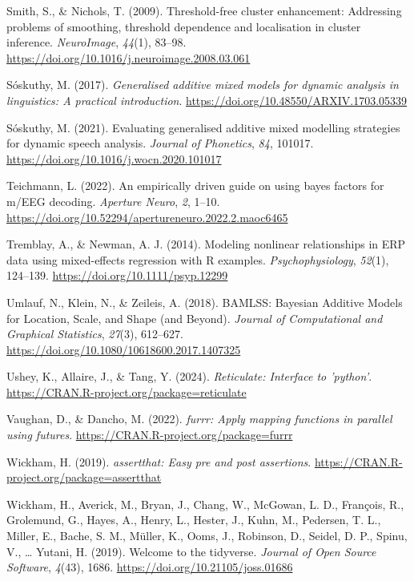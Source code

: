 \documentclass[
  doc,
  floatsintext,
  longtable,
  a4paper,
  nolmodern,
  notxfonts,
  notimes,
  donotrepeattitle,
  colorlinks=true,linkcolor=blue,citecolor=blue,urlcolor=blue]{apa7}
\newlength{\cslhangindent}
\newenvironment{CSLReferences}[2] %
 {\begin{list}{}{%
  \setlength{\itemindent}{0pt}
  \setlength{\leftmargin}{0pt}
  \setlength{\parsep}{0pt}
  \ifodd #1
   \setlength{\leftmargin}{\cslhangindent}
   \setlength{\itemindent}{-1\cslhangindent}
  \fi
  \setlength{\itemsep}{#2\baselineskip}}}
 {\end{list}}
\begin{document}
\begin{CSLReferences}{1}{0}
Smith, S., \& Nichols, T. (2009). Threshold-free cluster enhancement:
Addressing problems of smoothing, threshold dependence and localisation
in cluster inference. \emph{NeuroImage}, \emph{44}(1), 83--98.
\url{https://doi.org/10.1016/j.neuroimage.2008.03.061}

Sóskuthy, M. (2017). \emph{Generalised additive mixed models for dynamic
analysis in linguistics: A practical introduction}.
\url{https://doi.org/10.48550/ARXIV.1703.05339}

Sóskuthy, M. (2021). Evaluating generalised additive mixed modelling
strategies for dynamic speech analysis. \emph{Journal of Phonetics},
\emph{84}, 101017. \url{https://doi.org/10.1016/j.wocn.2020.101017}

Teichmann, L. (2022). An empirically driven guide on using bayes factors
for m/EEG decoding. \emph{Aperture Neuro}, \emph{2}, 1--10.
\url{https://doi.org/10.52294/apertureneuro.2022.2.maoc6465}

Tremblay, A., \& Newman, A. J. (2014). Modeling nonlinear relationships
in ERP data using mixed{-}effects regression with R examples.
\emph{Psychophysiology}, \emph{52}(1), 124--139.
\url{https://doi.org/10.1111/psyp.12299}

Umlauf, N., Klein, N., \& Zeileis, A. (2018). BAMLSS: Bayesian Additive
Models for Location, Scale, and Shape (and Beyond). \emph{Journal of
Computational and Graphical Statistics}, \emph{27}(3), 612--627.
\url{https://doi.org/10.1080/10618600.2017.1407325}

Ushey, K., Allaire, J., \& Tang, Y. (2024). \emph{Reticulate: Interface
to 'python'}. \url{https://CRAN.R-project.org/package=reticulate}

Vaughan, D., \& Dancho, M. (2022). \emph{{furrr}: Apply mapping
functions in parallel using futures}.
\url{https://CRAN.R-project.org/package=furrr}

Wickham, H. (2019). \emph{{assertthat}: Easy pre and post assertions}.
\url{https://CRAN.R-project.org/package=assertthat}

Wickham, H., Averick, M., Bryan, J., Chang, W., McGowan, L. D.,
François, R., Grolemund, G., Hayes, A., Henry, L., Hester, J., Kuhn, M.,
Pedersen, T. L., Miller, E., Bache, S. M., Müller, K., Ooms, J.,
Robinson, D., Seidel, D. P., Spinu, V., \ldots{} Yutani, H. (2019).
Welcome to the {tidyverse}. \emph{Journal of Open Source Software},
\emph{4}(43), 1686. \url{https://doi.org/10.21105/joss.01686}


\end{CSLReferences}
\end{document}
